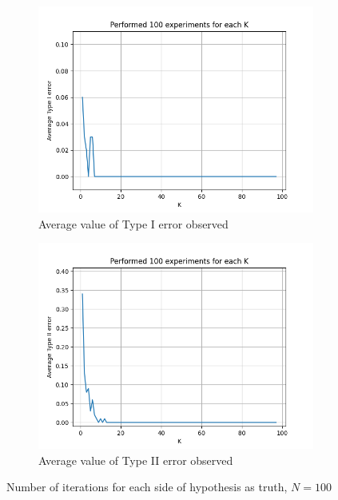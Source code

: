 \documentclass[fleqn, 11pt]{article}
\begin{document}
\newpage
\begin{figure}[H]
    \centering
    \begin{subfigure}[H]{0.49\textwidth}
        \centering
        \includegraphics[width=\textwidth]{P4/type1_100.png}
        \caption[]{Average value of Type I error observed}
    \end{subfigure}
    \begin{subfigure}[H]{0.49\textwidth}
        \centering
        \includegraphics[width=\textwidth]{P4/type2_100.png}
        \caption[]{Average value of Type II error observed}
    \end{subfigure}
    \caption{Number of iterations for each side of hypothesis as truth, $N = 100$}
\end{figure}
\end{document}
